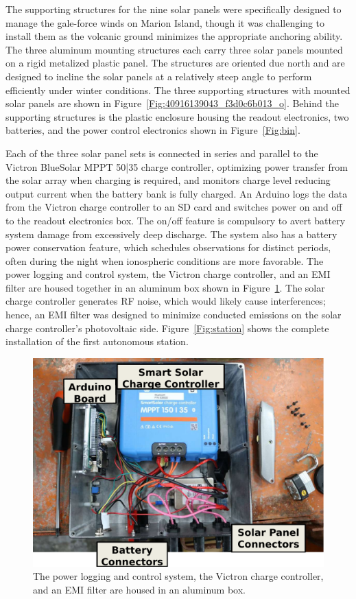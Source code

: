 The supporting structures for the nine solar panels were specifically designed to manage the gale-force winds on Marion Island, though it was challenging to install them as the volcanic ground minimizes the appropriate anchoring ability. The three aluminum mounting structures each carry three solar panels mounted on a rigid metalized plastic panel. The structures are oriented due north and are designed to incline the solar panels at a relatively steep angle to perform efficiently under winter conditions. The three supporting structures with mounted solar panels are shown in Figure~\ref{Fig:40916139043_f3d0c6b013_o}. Behind the supporting structures is the plastic enclosure housing the readout electronics, two batteries, and the power control electronics shown in Figure~\ref{Fig:bin}.

Each of the three solar panel sets is connected in series and parallel to the Victron BlueSolar MPPT 50|35 charge controller, optimizing power transfer from the solar array when charging is required, and monitors charge level reducing output current when the battery bank is fully charged. An Arduino logs the data from the Victron charge controller to an SD card and switches power on and off to the readout electronics box. The on/off feature is compulsory to avert battery system damage from excessively deep discharge. The system also has a battery power conservation feature, which schedules observations for distinct periods, often during the night when ionospheric conditions are more favorable. The power logging and control system, the Victron charge controller, and an EMI filter are housed together in an aluminum box shown in Figure~\ref{Fig:power_box_interior}. The solar charge controller generates RF noise, which would likely cause interferences; hence, an EMI filter was designed to minimize conducted emissions on the solar charge controller's photovoltaic side. Figure~\ref{Fig:station} shows the complete installation of the first autonomous station.

\begin{figure}
	\centering
	\includegraphics[width=\linewidth]{Figures/power_box_interior}
	\caption{The power logging and control system, the Victron charge controller, and an EMI filter are housed in an aluminum box.}
	\label{Fig:power_box_interior}
\end{figure}

